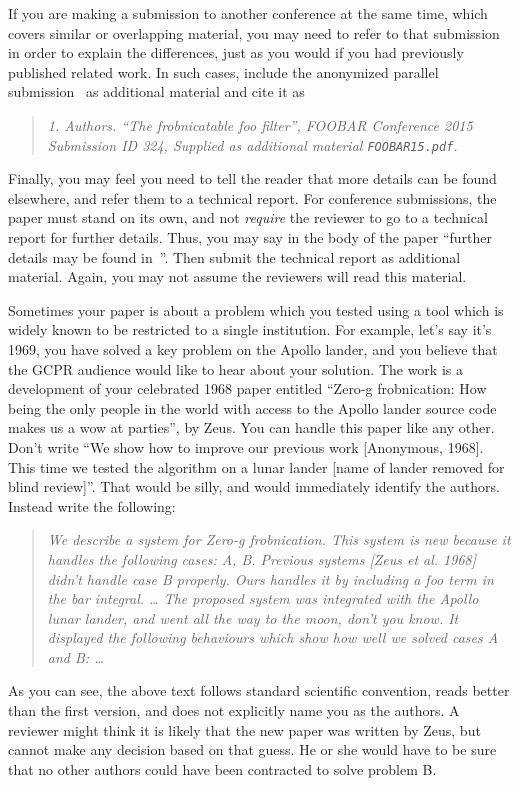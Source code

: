 \documentclass[runningheads]{llncs}
\begin{document}
	If you are making a submission to another conference at the same time, which covers similar or overlapping material, you may need to refer to that submission in order to explain the differences, just as you would if you had previously published related work.
	In such cases, include the anonymized parallel submission~\cite{Authors10} as additional material and cite it as
	\begin{quote}
		\emph{1. Authors. ``The frobnicatable foo filter'', FOOBAR Conference 2015 Submission ID 324, Supplied as additional material {\tt FOOBAR15.pdf}.}
	\end{quote}

	Finally, you may feel you need to tell the reader that more details can be found elsewhere, and refer them to a technical report.
	For conference submissions, the paper must stand on its own, and not {\em require} the reviewer to go to a technical report for further details.
	Thus, you may say in the body of the paper ``further details may be found in~\cite{Authors10b}''.
	Then submit the technical report as additional material.
	Again, you may not assume the reviewers will read this material.

	Sometimes your paper is about a problem which you tested using a tool which is widely known to be restricted to a single institution.
	For example, let's say it's 1969, you have solved a key problem on the Apollo lander, and you believe that the GCPR audience would like to hear about your solution.
	The work is a development of your celebrated 1968 paper entitled ``Zero-g frobnication: How being the only people in the world with access to the Apollo lander source code makes us a wow at parties'', by Zeus.
	You can handle this paper like any other.
	Don't write ``We show how to improve our previous work [Anonymous, 1968].
	This time we tested the algorithm on a lunar lander [name of lander removed for blind review]''.
	That would be silly, and would immediately identify the authors.
	Instead write the following:
	\begin{quotation}
		\emph{
			We describe a system for Zero-g frobnication.
			This system is new because it handles the following cases: A, B.
			Previous systems [Zeus et al. 1968] didn't handle case B properly.
			Ours handles it by including a foo term in the bar integral.
			\ldots
			The proposed system was integrated with the Apollo lunar lander, and went all the way to the moon, don't you know.
			It displayed the following behaviours which show how well we solved cases A and B: \ldots
		}
	\end{quotation}
	As you can see, the above text follows standard scientific convention, reads better than the first version, and does not explicitly name you as the authors.
	A reviewer might think it is likely that the new paper was written by Zeus, but cannot make any decision based on that guess.
	He or she would have to be sure that no other authors could have been contracted to solve problem B.
\end{document}
